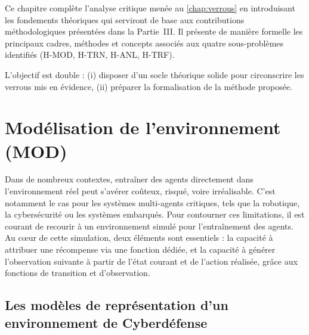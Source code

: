 \noindent
Ce chapitre complète l’analyse critique menée au \autoref{chap:verrous} en introduisant
les fondements théoriques qui serviront de base aux contributions méthodologiques
présentées dans la Partie~III.
Il présente de manière formelle les principaux cadres, méthodes et concepts
associés aux quatre sous-problèmes identifiés (H-MOD, H-TRN, H-ANL, H-TRF).

L’objectif est double :
(i) disposer d’un socle théorique solide pour circonscrire les verrous mis en évidence,
(ii) préparer la formalisation de la méthode proposée.

\section{Modélisation de l'environnement (MOD)}

Dans de nombreux contextes, entraîner des agents directement dans l’environnement réel peut s’avérer coûteux, risqué, voire irréalisable. C’est notamment le cas pour les systèmes multi-agents critiques, tels que la robotique, la cybersécurité ou les systèmes embarqués. Pour contourner ces limitations, il est courant de recourir à un environnement simulé pour l’entraînement des agents. Au cœur de cette simulation, deux éléments sont essentiels : la capacité à attribuer une récompense via une fonction dédiée, et la capacité à générer l’observation suivante à partir de l’état courant et de l’action réalisée, grâce aux fonctions de transition et d’observation.

\subsection{Les modèles de représentation d'un environnement de Cyberdéfense}



